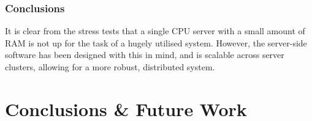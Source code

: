 \documentclass[preprint,12pt,3p]{elsarticle}
\begin{document}
\subsubsection{Conclusions}
It is clear from the stress tests that a single CPU server with a small amount of RAM is not up for the task of a hugely utilised system. However, the server-side software has been designed with this in mind, and is scalable across server clusters, allowing for a more robust, distributed system.

\section{Conclusions \& Future Work}

\clearpage

{}
\end{document}

